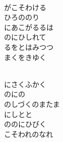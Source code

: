 \documentclass[10pt,b5j]{tarticle} %
\begin{document}
\vspace{1.5em} %
\newcommand{\linespace}{0.5em} %
\newcommand{\blocksize}{0.5\hsize} %
\newcommand{\itemmargin}{3em} %
\begin{enumerate} %
    \setlength{\itemindent}{\itemmargin} %
    \begin{minipage}[c]{\blocksize}
    
        \vspace{\linespace}
        \item~\\
        がこそわける\\
        ひろののり\\
        にあこがるるは\\
        のにひしれて\\
        るをとはみつつ\\
        まくをきゆく
        
    \end{minipage}
    \begin{minipage}[c]{\blocksize}
        
        \vspace{\linespace}
        \item~\\
        にさくふかく\\
        のにの\\
        のしづくのまたま\\
        にしとと\\
        ののにひびく\\
        こそわれのなれ
        
    \end{minipage}
    \begin{minipage}[c]{\blocksize}
        

\end{minipage}
\end{enumerate}
\end{document}
